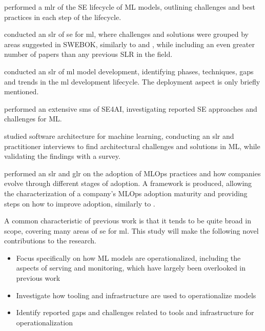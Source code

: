 \textcite{John2021} performed a \acrfull{mlr} of the SE lifecycle of ML models, outlining challenges and best practices in each step of the lifecycle.

\textcite{Giray2021} conducted an \acrshort{slr} of \acrshort{se} for \acrshort{ml}, where challenges and solutions were grouped by areas suggested in SWEBOK, similarly to \cite{Kumeno2020} and \cite{Nascimento2020}, while including an even greater number of papers than any previous SLR in the field.

\textcite{Lorenzoni2021} conducted an \acrshort{slr} of \acrshort{ml} model development, identifying phases, techniques, gaps and trends in the \acrshort{ml} development lifecycle.
The deployment aspect is only briefly mentioned.

\textcite{MartinezFernandez2021} performed an extensive \acrshort{sms} of SE4AI, investigating reported SE approaches and challenges for ML.

\textcite{Serban2021} studied software architecture for machine learning, conducting an \acrshort{slr} and practitioner interviews to find architectural challenges and solutions in ML, while validating the findings with a survey.

\textcite{John2021a} performed an \acrshort{slr} and \acrshort{glr} on the adoption of MLOps practices and how companies evolve through different stages of adoption.
A framework is produced, allowing the characterization of a company's MLOps adoption maturity and providing steps on how to improve adoption, similarly to \cite{Lwakatare2020a}.

A common characteristic of previous work is that it tends to be quite broad in scope, covering many areas of \acrshort{se} for \acrshort{ml}.
This study will make the following novel contributions to the research.
\begin{itemize}
    \item Focus specifically on how ML models are operationalized, including the aspects of serving and monitoring, which have largely been overlooked in previous work
    \item Investigate how tooling and infrastructure are used to operationalize models
    \item Identify reported gaps and challenges related to tools and infrastructure for operationalization
\end{itemize}

